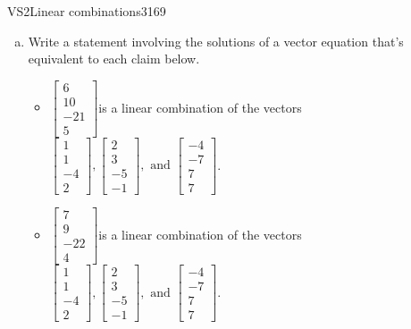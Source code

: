 \begin{exercise}{VS2}{Linear combinations}{3169} 
\begin{exerciseStatement} 

\begin{enumerate}[(a)]
\item  

 Write a statement involving the solutions of a vector equation that's equivalent to each claim below. 

 

\begin{itemize}
\item  

 \(\left[\begin{array}{c}
6 \\
10 \\
-21 \\
5
\end{array}\right]\)is a linear combination of the vectors \(\left[\begin{array}{c}
1 \\
1 \\
-4 \\
2
\end{array}\right] , \left[\begin{array}{c}
2 \\
3 \\
-5 \\
-1
\end{array}\right] , \text{ and } \left[\begin{array}{c}
-4 \\
-7 \\
7 \\
7
\end{array}\right]\). 

 
\item  

 \(\left[\begin{array}{c}
7 \\
9 \\
-22 \\
4
\end{array}\right]\)is a linear combination of the vectors \(\left[\begin{array}{c}
1 \\
1 \\
-4 \\
2
\end{array}\right] , \left[\begin{array}{c}
2 \\
3 \\
-5 \\
-1
\end{array}\right] , \text{ and } \left[\begin{array}{c}
-4 \\
-7 \\
7 \\
7
\end{array}\right]\). 


\end{itemize}
\end{enumerate}
\end{exerciseStatement}
\end{exercise}
